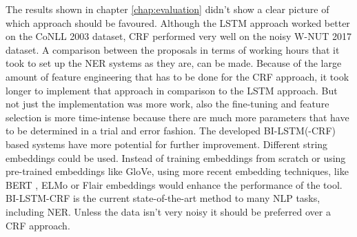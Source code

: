 \documentclass[12pt]{book}
\begin{document}
	The results shown in chapter \ref{chap:evaluation} didn't show a clear picture of which approach should be favoured. Although the LSTM approach worked better on the CoNLL 2003 dataset, CRF performed very well on the noisy W-NUT 2017 dataset.
	A comparison between the proposals in terms of working hours that it took to set up the NER systems as they are, can be made. Because of the large amount of feature engineering that has to be done for the CRF approach, it took longer to implement that approach in comparison to the LSTM approach. But not just the implementation was more work, also the fine-tuning and feature selection is more time-intense because there are much more parameters that have to be determined in a trial and error fashion.
	The developed BI-LSTM(-CRF) based systems have more potential for further improvement. Different string embeddings could be used. Instead of training embeddings from scratch or using pre-trained embeddings like GloVe, using more recent embedding techniques, like BERT \cite{devlin2018bert}, ELMo \cite{peters2018deep} or Flair \cite{akbik2018contextual} embeddings would enhance the performance of the tool. 
	BI-LSTM-CRF is the current state-of-the-art method to many NLP tasks, including NER. Unless the data isn't very noisy it should be preferred over a CRF approach.
	
	
	
\end{document}
